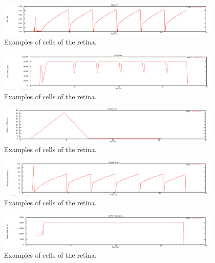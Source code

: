 \documentclass[12pt]{article}
\begin{document}
\begin{figure}[t]
\centering \includegraphics[scale=.35]{figures/Test0_Tahoe/flow_rtt.png}
\caption{Examples of cells of the retina.}
\label{fig:test0_tahoe_flow_rtt}
\end{figure}

\begin{figure}[t]
\centering \includegraphics[scale=.35]{figures/Test0_Tahoe/link_rate.png}
\caption{Examples of cells of the retina.}
\label{fig:test0_tahoe_link_rate}
\end{figure}

\begin{figure}[t]
\centering \includegraphics[scale=.35]{figures/Test0_Tahoe/packet_loss.png}
\caption{Examples of cells of the retina.}
\label{fig:test0_tahoe_packet_loss}
\end{figure}

\begin{figure}[t]
\centering \includegraphics[scale=.35]{figures/Test0_Tahoe/window_size.png}
\caption{Examples of cells of the retina.}
\label{fig:test0_tahoe_windnow_size}
\end{figure}




\begin{figure}[t]
\centering \includegraphics[scale=.35]{figures/Test0_Vegas/buffer_occ.png}
\caption{Examples of cells of the retina.}
\label{fig:test0_vegas_buffer_occ}
\end{figure}
\end{document}
